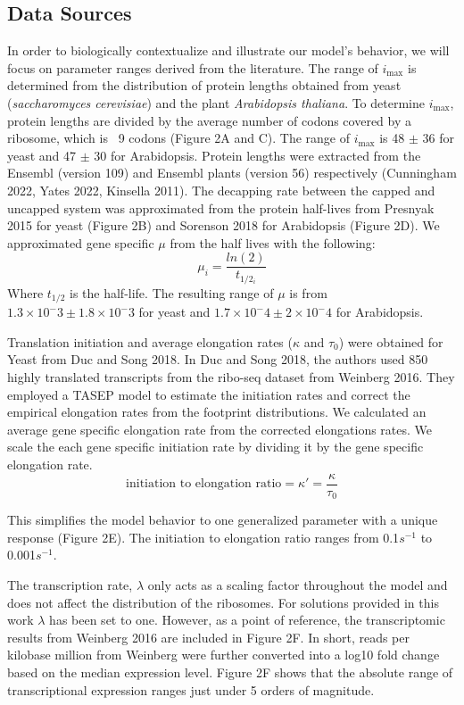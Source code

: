 \documentclass[review]{elsarticle}
\newcommand{\imax}{\ensuremath{{i_{\max}}}\xspace}
\begin{document}
\subsection{Data Sources}

In order to biologically contextualize and illustrate our model's behavior, we will focus on parameter ranges derived from the literature.
The range of \imax is determined from the distribution of protein lengths obtained from yeast (\textit{saccharomyces cerevisiae}) and the plant \textit{Arabidopsis thaliana}. To determine \imax, protein lengths are divided by the average number of codons covered by a ribosome, which is ~9 codons (Figure 2A and C). The range of \imax is  48 $\pm$ 36 for yeast and 47 $\pm$ 30 for Arabidopsis.
Protein lengths were extracted from the Ensembl (version 109) and Ensembl plants (version 56) respectively (Cunningham 2022, Yates 2022, Kinsella 2011).  
The decapping rate between the capped and uncapped system was approximated from the protein half-lives from Presnyak 2015 for yeast (Figure 2B) and Sorenson 2018 for Arabidopsis (Figure 2D).
We approximated gene specific $\mu$ from the half lives with the following:
	\begin{equation*}
		\mu_i = \frac{ln(2)}{t_{1/2_i}}
	\end{equation*}
Where $t_{1/2}$ is the half-life. The resulting range of $\mu$ is from $1.3 \times 10^-3 \pm 1.8 \times 10^-3$ for yeast and $1.7 \times 10^-4 \pm 2 \times 10^-4$ for Arabidopsis. 

Translation initiation and average elongation rates ($\kappa$ and $\tau_0$) were obtained for Yeast from Duc and Song 2018. In Duc and Song 2018, the authors used 850 highly translated transcripts from the ribo-seq dataset from Weinberg 2016. They employed a TASEP model to estimate the initiation rates and correct the empirical elongation rates from the footprint distributions. We calculated an average gene specific elongation rate from the corrected elongations rates. We scale the each gene specific initiation rate by dividing it by the gene specific elongation rate.
\begin{equation}
	\text{initiation to elongation ratio} = \kappa' = \frac{\kappa}{\tau_0}
\end{equation}

This simplifies the model behavior to one generalized parameter with a unique response (Figure 2E).  The initiation to elongation ratio ranges from 0.1$s^{-1}$ to 0.001$s^{-1}$.

The transcription rate, $\lambda$ only acts as a scaling factor throughout the model and does not affect the distribution of the ribosomes. For solutions provided in this work $\lambda$ has been set to one. However, as a point of reference, the transcriptomic results from Weinberg 2016 are included in Figure 2F. In short, reads per kilobase million from Weinberg were further converted into a log10 fold change based on the median expression level. Figure 2F shows that the absolute range of transcriptional expression ranges just under 5 orders of magnitude.
\end{document}
